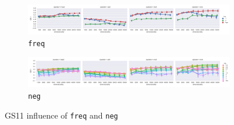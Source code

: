 \begin{figure}
  \centering

  \begin{subfigure}[t]{\textwidth}
    \includegraphics[width=1.1\textwidth]{supplement/figures/GS11-interaction-freq}

  \caption{\texttt{freq}}
  \label{fig:gs11-freq}
  \end{subfigure}

  \begin{subfigure}[t]{\textwidth}
    \includegraphics[width=1.1\textwidth]{supplement/figures/GS11-interaction-neg}

  \caption{\texttt{neg}}
  \label{fig:gs11-neg}
  \end{subfigure}

  \caption{GS11 influence of \texttt{freq} and \texttt{neg}}
\end{figure}
